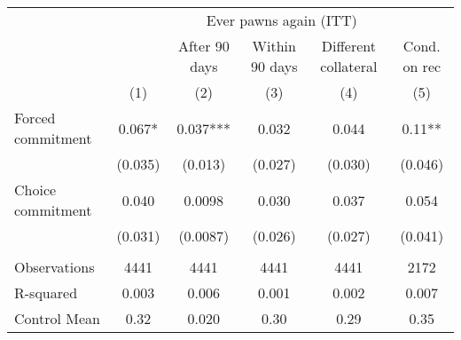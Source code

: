 \begin{tabular}{lccccc}
\toprule
      & \multicolumn{5}{c}{Ever pawns again (ITT)} \\
\cmidrule{2-6}      &       & After 90 days & Within 90 days & Different collateral & Cond. on rec \\
\midrule
\midrule
      & (1)   & (2)   & (3)   & (4)   & (5) \\
\midrule
\midrule
Forced commitment & 0.067* & 0.037*** & 0.032 & 0.044 & 0.11** \\
      & (0.035) & (0.013) & (0.027) & (0.030) & (0.046) \\
Choice commitment & 0.040 & 0.0098 & 0.030 & 0.037 & 0.054 \\
      & (0.031) & (0.0087) & (0.026) & (0.027) & (0.041) \\
      &       &       &       &       &  \\
\midrule
Observations & 4441  & 4441  & 4441  & 4441  & 2172 \\
R-squared & 0.003 & 0.006 & 0.001 & 0.002 & 0.007 \\
Control Mean & 0.32  & 0.020 & 0.30  & 0.29  & 0.35 \\
\bottomrule
\bottomrule
\end{tabular}%

